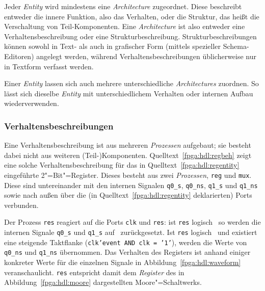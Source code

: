 Jeder \textit{Entity} wird mindestens eine \textit{Architecture} zugeordnet.
Diese beschreibt entweder die innere Funktion, also das Verhalten, oder die
Struktur, das heißt die Verschaltung von Teil-Komponenten. Eine
\textit{Architecture} ist also entweder eine Verhaltensbeschreibung oder eine
Strukturbeschreibung. Strukturbeschreibungen können sowohl in Text- als auch
in grafischer Form (mittels spezieller Schema-Editoren) angelegt werden, während
Verhaltensbeschreibungen üblicherweise nur in Textform verfasst werden.
\cite[vgl.][27]{kesel2013}

Einer \textit{Entity} lassen sich auch mehrere unterschiedliche
\textit{Architectures} zuordnen. So lässt sich dieselbe \textit{Entity} mit
unterschiedlichem Verhalten oder internen Aufbau wiederverwenden.
\cite[vgl.][27]{kesel2013}

\subsubsection{Verhaltensbeschreibungen}

Eine Verhaltensbeschreibung ist aus mehreren \textit{Prozessen} aufgebaut; sie
besteht dabei nicht aus weiteren (Teil-)Komponenten.
Quelltext~\ref{fpga:hdl:regbeh} zeigt eine solche Verhaltensbeschreibung für
das in Quelltext~\ref{fpga:hdl:regentity} eingeführte 2"=Bit"=Register. Dieses
besteht aus zwei \textit{Prozessen}, \texttt{reg} und \texttt{mux}. Diese sind
untereinander mit den internen Signalen \texttt{q0\_s}, \texttt{q0\_ns},
\texttt{q1\_s} und \texttt{q1\_ns} sowie nach außen über die (in
Quelltext~\ref{fpga:hdl:regentity} deklarierten) Ports verbunden.
\cite[vgl.][29]{kesel2013}

Der Prozess \texttt{res} reagiert auf die Ports \texttt{clk} und \texttt{res}:
ist \texttt{res} logisch \grqq\, so werden die internen Signale
\texttt{q0\_s} und \texttt{q1\_s} auf \grqq\ zurückgesetzt. Ist
\texttt{res} logisch \grqq\ und existiert eine steigende Taktflanke
(\texttt{clk'event AND clk = '1'}), werden die Werte von \texttt{q0\_ns} und
\texttt{q1\_ns} übernommen. Das Verhalten des Registers ist anhand einiger
konkreter Werte für die einzelnen Signale in Abbildung~\ref{fpga:hdl:waveform}
veranschaulicht. \texttt{res} entspricht damit dem \textit{Register} des in
Abbildung~\ref{fpga:hdl:moore} dargestellten Moore"=Schaltwerks.
\cite[vgl.][30--31]{kesel2013}

